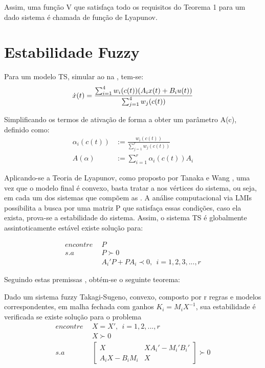 Assim, uma função V que satisfaça todo os requisitos do Teorema 1 para um dado sistema é chamada de função de Lyapunov. 


\section{Estabilidade Fuzzy}
Para um modelo TS, simular ao na , tem-se:
\begin{align*}
	\dot{x}(t) = \frac{\sum_{i=1}^{4}  w_i(c(t))(A_i  x(t) +  B_i  u(t))}{\sum_{j=1}^{4} w_j(c(t))} \vspace{0.5cm}
\end{align*}

Simplificando os termos de ativação de forma a obter um parâmetro A(c), definido como:
\begin{align*}
	\alpha_i (c(t)) &:= \frac{w_i(c(t))}{\sum_{j=1}^{r}w_j(c(t))} \\
	A(\alpha) &:= \sum_{i=1}^{r} \alpha_i (c(t))A_i
\end{align*}

Aplicando-se a Teoria de Lyapunov, como proposto por Tanaka e Wang \cite{wang}, uma vez que o modelo final é convexo, basta tratar a  nos vértices do sistema, ou seja, em cada um dos sistemas que compõem as . 
A análise computacional via LMIs possibilita a busca por uma matriz P que satisfaça essas condições, caso ela exista, prova-se a estabilidade do sistema. Assim, o sistema TS é globalmente assintoticamente estável \cite{tanakaWang} existe solução para:

\begin{align} \label{eqLyapXk}
	encontre \ \ &P \nonumber \\
	s.a \ \ &P \succ 0 \nonumber \\
	&A_i'P + P A_i \prec 0, \ \ i=1,2,3, ... , r
\end{align}

Seguindo estas premissas \cite{wang}, obtém-se o seguinte teorema:
\begin{myteo} \label{teoControlador}
Dado um sistema fuzzy Takagi-Sugeno, convexo, composto por r regras e modelos correspondentes, em malha fechada com ganhos $K_i = M_i X^{-1}$, sua estabilidade é verificada se existe solução para o problema
	\begin{align} \label{eqContFuzzy}
		encontre \ \ &X = X', \ \ i = 1,2,...,r \nonumber \\
		&X \succ 0 \nonumber \\
		s.a \ \ & 
		\begin{bmatrix}
			X	&	XA_i' - M_i'B_i'  \\
			A_iX - B_iM_i &	X
		\end{bmatrix} \succ 0 \nonumber \\
	\end{align}
\end{myteo}

%

